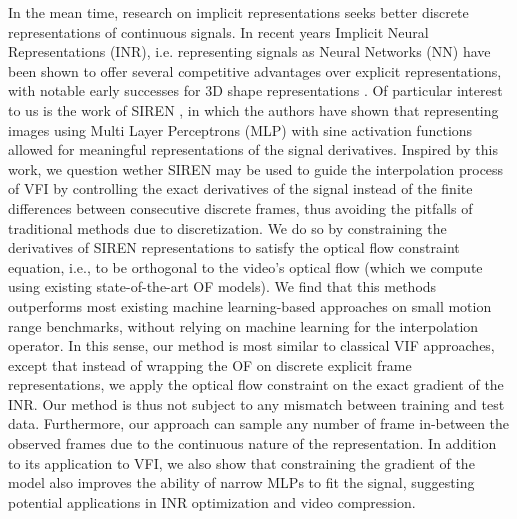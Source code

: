 \documentclass{article}
\begin{document}
In the mean time, research on implicit representations seeks better discrete representations of continuous signals.
In recent years Implicit Neural Representations (INR), i.e. representing signals as Neural Networks (NN)
have been shown to offer several competitive advantages over explicit representations,
with notable early successes for 3D shape representations \cite{mildenhall2020nerf}.
Of particular interest to us is the work of SIREN \cite{sitzmann2020implicit},
in which the authors have shown that representing images using Multi Layer Perceptrons (MLP) with sine activation functions
allowed for meaningful representations of the signal derivatives.
Inspired by this work, we question wether SIREN may be used to guide the interpolation
process of VFI by controlling the exact derivatives of the signal instead of the finite differences
between consecutive discrete frames, thus avoiding the pitfalls of traditional methods due to discretization.
We do so by constraining the derivatives of SIREN representations to satisfy the optical flow constraint equation,
i.e., to be orthogonal to the video's optical flow
(which we compute using existing state-of-the-art OF models).
We find that this methods outperforms most existing
machine learning-based approaches on small motion range benchmarks,
without relying on machine learning for the interpolation operator.
In this sense, our method is most similar to classical VIF approaches,
except that instead of wrapping the OF on discrete explicit frame representations,
we apply the optical flow constraint on the exact gradient of the INR.
Our method is thus not subject to any mismatch between training and test data.
Furthermore, our approach can sample any number of frame in-between the observed frames
due to the continuous nature of the representation.
In addition to its application to VFI, we also show that constraining the gradient
of the model also improves the ability of narrow MLPs to fit the signal,
suggesting potential applications in INR optimization and video compression.
\end{document}
